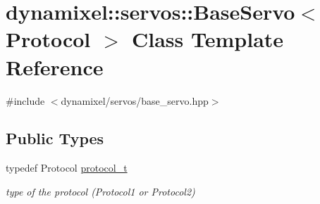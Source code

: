\hypertarget{classdynamixel_1_1servos_1_1_base_servo}{}\section{dynamixel\+:\+:servos\+:\+:Base\+Servo$<$ Protocol $>$ Class Template Reference}
\label{classdynamixel_1_1servos_1_1_base_servo}


{\ttfamily \#include $<$dynamixel/servos/base\+\_\+servo.\+hpp$>$}

\subsection*{Public Types}
\begin{DoxyCompactItemize}
\item 
typedef Protocol \hyperlink{classdynamixel_1_1servos_1_1_base_servo_ac484c11279ee2576a9a3bb8c940e0baf}{protocol\+\_\+t}
\begin{DoxyCompactList}\small\item\em type of the protocol (Protocol1 or Protocol2) \end{DoxyCompactList}\end{DoxyCompactItemize}
